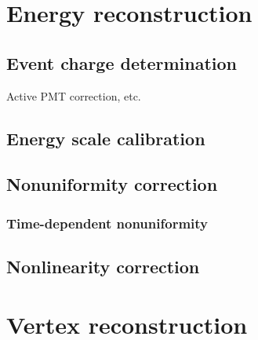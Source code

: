 \documentclass[../thesis.tex]{subfiles}
\begin{document}
\section{Energy reconstruction}
\label{sec:reconEnergy}

\subsection{Event charge determination}
\label{sec:reconEnergyChage}

Active PMT correction, etc.

\subsection{Energy scale calibration}
\label{sec:reconEnergyScale}

\subsection{Nonuniformity correction}
\label{sec:reconEnergyNU}

\subsubsection{Time-dependent nonuniformity}
\label{sec:reconEnergyTDNU}

\subsection{Nonlinearity correction}
\label{sec:reconEnergyNL}

\section{Vertex reconstruction}
\label{sec:reconVertex}
\end{document}
